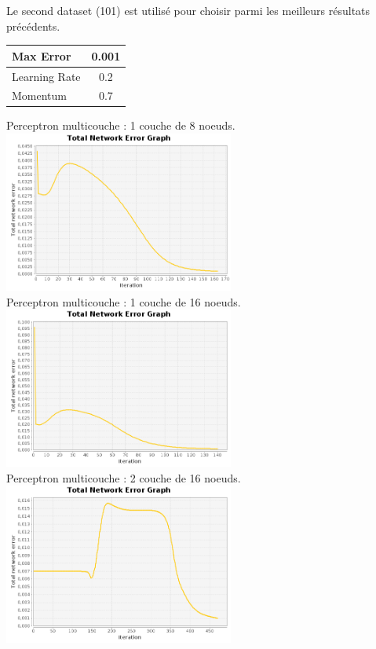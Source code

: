 \documentclass[10pt]{report}
\begin{document}
Le second dataset (101) est utilisé pour choisir parmi les meilleurs résultats précédents.

\begin{center}

\begin{tabular}{|l|c|}
	\hline
	Max Error & 0.001 \\
	\hline
	Learning Rate & 0.2 \\
	\hline
	Momentum & 0.7 \\
	\hline
\end{tabular}

Perceptron multicouche : 1 couche de 8 noeuds.\\
\includegraphics[height=200px]{img/SQUARE_8_101.png}\\
Perceptron multicouche : 1 couche de 16 noeuds.\\
\includegraphics[height=200px]{img/SQUARE_16_101.png}\\
Perceptron multicouche : 2 couche de 16 noeuds.\\
\includegraphics[height=200px]{img/SQUARE_16_16_101.png}\\
\end{center}
\end{document}
